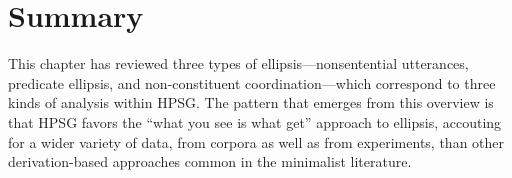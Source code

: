 {%
%
%
%
%

%
%
%
%
%
%
%
%
%
%
%
%
%





\section{Summary}
\label{sum}
This chapter has reviewed three types of ellipsis---nonsentential utterances, predicate ellipsis, and non-constituent coordination---which correspond to three kinds of analysis within HPSG. The pattern that emerges from this overview is that HPSG favors the ``what you see is what get'' approach to ellipsis,
 accouting for a wider variety of data,  from corpora 
 as well as from experiments,  than other derivation-based approaches common in the minimalist literature.











}
